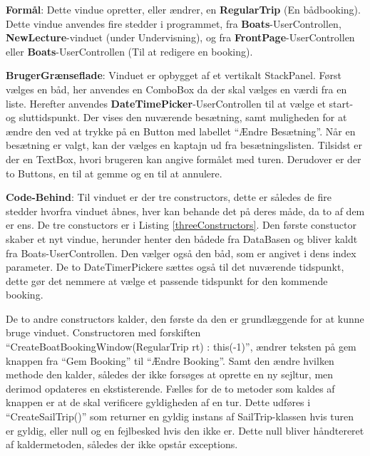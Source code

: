 \textbf{Formål}: 
Dette vindue opretter, eller ændrer, en \textbf{RegularTrip} (En bådbooking).
Dette vindue anvendes fire stedder i programmet, fra \textbf{Boats}-UserControllen, \textbf{NewLecture}-vinduet (under Undervisning), og fra \textbf{FrontPage}-UserControllen eller \textbf{Boats}-UserControllen (Til at redigere en booking). 

\textbf{BrugerGrænseflade}: 
Vinduet er opbygget af et vertikalt StackPanel.
Først vælges en båd, her anvendes en ComboBox da der skal vælges en værdi fra en liste.
Herefter anvendes \textbf{DateTimePicker}-UserControllen til at vælge et start- og sluttidspunkt.
Der vises den nuværende besætning, samt muligheden for at ændre den ved at trykke på en Button med labellet ``Ændre Besætning''.
Når en besætning er valgt, kan der vælges en kaptajn ud fra besætningslisten.
Tilsidst er der en TextBox, hvori brugeren kan angive formålet med turen.
Derudover er der to Buttons, en til at gemme og en til at annulere.

\textbf{Code-Behind}: 
Til vinduet er der tre constructors, dette er således de fire stedder hvorfra vinduet åbnes, hver kan behande det på deres måde, da to af dem er ens. 
De tre constuctors er i Listing \ref{threeConstructors}.
Den første constuctor skaber et nyt vindue, herunder henter den bådede fra DataBasen og bliver kaldt fra Boats-UserControllen.
Den vælger også den båd, som er angivet i dens index parameter.
De to DateTimerPickere sættes også til det nuværende tidspunkt, dette gør det nemmere at vælge et passende tidspunkt for den kommende booking.

De to andre constructors kalder, den første da den er grundlæggende for at kunne bruge vinduet. 
Constructoren med forskiften ``CreateBoatBookingWindow(RegularTrip rt) : this(-1)'', ændrer teksten på gem knappen fra ``Gem Booking'' til ``Ændre Booking''. 
Samt den ændre hvilken methode den kalder, således der ikke forsøges at oprette en ny sejltur, men derimod opdateres en ekstisterende. 
Fælles for de to metoder som kaldes af knappen er at de skal verificere gyldigheden af en tur. 
Dette udføres i ``CreateSailTrip()'' som returner en gyldig instans af SailTrip-klassen hvis turen er gyldig, eller null og en fejlbesked hvis den ikke er. 
Dette null bliver håndtereret af kaldermetoden, således der ikke opstår exceptions.


